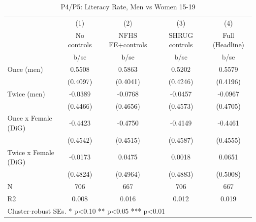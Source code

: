 \begin{table}[htbp]\centering
\def\sym#1{\ifmmode^{#1}\else\(^{#1}\)\fi}
\caption{P4/P5: Literacy Rate, Men vs Women 15-19}
\begin{tabular}{l*{4}{c}}
\toprule
            &\multicolumn{1}{c}{(1)}   &\multicolumn{1}{c}{(2)}   &\multicolumn{1}{c}{(3)}   &\multicolumn{1}{c}{(4)}   \\
            & No controls   &NFHS FE+controls   &SHRUG controls   &Full (Headline)   \\
            &        b/se   &        b/se   &        b/se   &        b/se   \\
\midrule
Once (men)  &      0.5508   &      0.5863   &      0.5202   &      0.5579   \\
            &    (0.4097)   &    (0.4041)   &    (0.4246)   &    (0.4196)   \\
Twice (men) &     -0.0389   &     -0.0768   &     -0.0457   &     -0.0967   \\
            &    (0.4466)   &    (0.4656)   &    (0.4573)   &    (0.4705)   \\
Once x Female (DiG)&     -0.4423   &     -0.4750   &     -0.4149   &     -0.4461   \\
            &    (0.4542)   &    (0.4515)   &    (0.4587)   &    (0.4555)   \\
Twice x Female (DiG)&     -0.0173   &      0.0475   &      0.0018   &      0.0651   \\
            &    (0.4824)   &    (0.4964)   &    (0.4883)   &    (0.5008)   \\
\midrule
N           &         706   &         667   &         706   &         667   \\
R2          &       0.008   &       0.016   &       0.012   &       0.019   \\
\bottomrule
\multicolumn{5}{l}{\footnotesize Cluster-robust SEs. * p<0.10 ** p<0.05 *** p<0.01}\\
\end{tabular}
\end{table}
